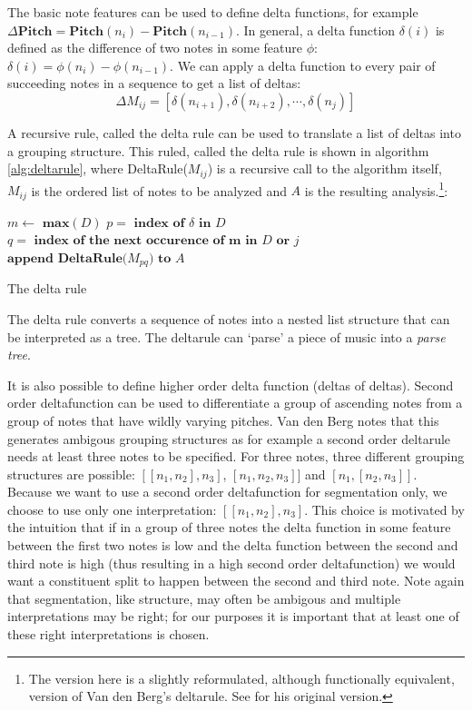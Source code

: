 \documentclass[a4paper,10pt]{article}
\begin{document}
The basic note features can be used to define delta functions, for example $\Delta\textbf{Pitch} = \textbf{Pitch}(n_i) - \textbf{Pitch}(n_{i-1})$. In general, a delta function $\delta(i)$ is defined as the difference of two notes in some feature $\phi$: $\delta(i) = \phi(n_i) - \phi(n_{i-1})$. We can apply a delta function to every pair of succeeding notes in a sequence to get a list of deltas: 
\[\Delta M_{ij} = [\delta(n_{i+1}), \delta(n_{i+2}), \cdots, \delta(n_{j})]\]

A recursive rule, called the delta rule can be used to translate a list of deltas into a grouping structure. This ruled, called the delta rule is shown in algorithm \ref{alg:deltarule}, where DeltaRule($M_{ij}$) is a recursive call to the algorithm itself, $M_{ij}$ is the ordered list of notes to be analyzed and $A$ is the resulting analysis.\footnote{The version here is a slightly reformulated, although functionally equivalent, version of Van den Berg's deltarule. See \cite{markwin} for his original version.}:
\begin{algorithm}
\begin{algorithmic}
\STATE $m \leftarrow \textbf{ max}(D)$
\STATE $p = \textbf{ index of }\delta \textbf{ in } D$
\STATE $q = \textbf{ index of the next occurence of m in }D \textbf{ or } j$
\STATE $\textbf{append DeltaRule(}M_{pq}\textbf{) to } A$
\ENDIF
\ENDFOR
{}
\end{algorithmic}
\caption{The delta rule}
\label{alg:deltarule}
\end{algorithm}

The delta rule converts a sequence of notes into a nested list structure that can be interpreted as a tree. The deltarule can `parse' a piece of music into a \textit{parse tree}.

It is also possible to define higher order delta function (deltas of deltas). Second order deltafunction can be used to differentiate a group of ascending notes from a group of notes that have wildly varying pitches. Van den Berg notes that this generates ambigous grouping structures as for example a second order deltarule needs at least three notes to be specified. For three notes, three different grouping structures are possible: $[[n_1, n_2], n_3]$, $[n_1, n_2, n_3]]$ and $[n_1, [n_2, n_3]]$. Because we want to use a second order deltafunction for segmentation only, we choose to use only one interpretation: $[[n_1, n_2], n_3]$. This choice is motivated by the intuition that if in a group of three notes the delta function in some feature between the first two notes is low and the delta function between the second and third note is high (thus resulting in a high second order deltafunction) we would want a constituent split to happen between the second and third note. Note again that segmentation, like structure, may often be ambigous and multiple interpretations may be right; for our purposes it is important that at least one of these right interpretations is chosen. 
\end{document}
